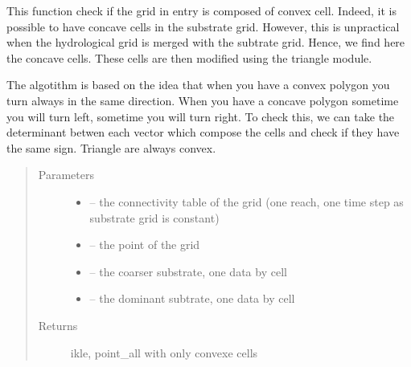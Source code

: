 \documentclass[letterpaper,10pt,english]{sphinxmanual}
\begin{document}

\begin{fulllineitems}
\label{\detokenize{index:src.substrate.modify_grid_if_concave}}
This function check if the grid in entry is composed of convex cell. Indeed, it is possible to have concave
cells in the substrate grid. However, this is unpractical when the hydrological grid is merged with the subtrate
grid. Hence, we find here the concave cells. These cells are then modified using the triangle module.

The algotithm is based on the idea that when you have a convex polygon you turn always in the same direction.
When you have a concave polygon sometime you will turn left, sometime you will turn right. To check this,
we can take the determinant betwen each vector which compose the cells and check if they have the same sign.
Triangle are always convex.
\begin{quote}\begin{description}
\item[{Parameters}] \leavevmode\begin{itemize}
\item {} 
 -- the connectivity table of the grid (one reach, one time step as substrate grid is constant)

\item {} 
 -- the point of the grid

\item {} 
 -- the coarser substrate, one data by cell

\item {} 
 -- the dominant subtrate, one data by cell

\end{itemize}

\item[{Returns}] \leavevmode
ikle, point\_all with only convexe cells

\end{description}\end{quote}

\end{fulllineitems}

\end{document}
